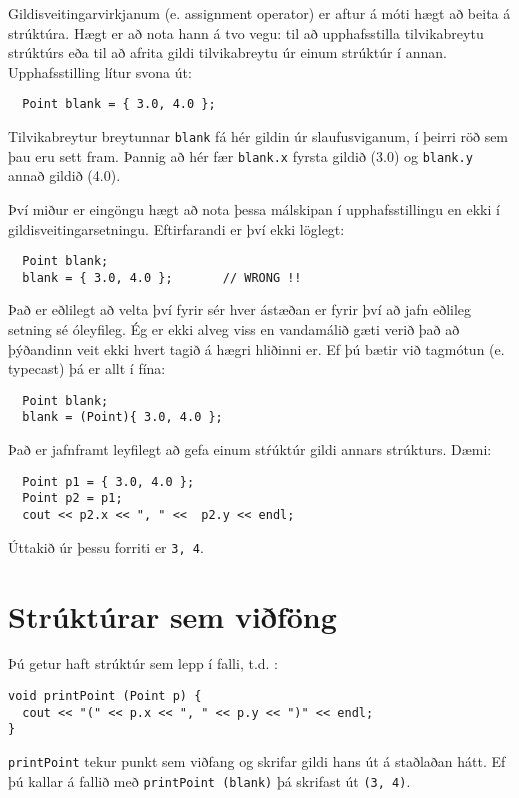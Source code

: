 Gildisveitingarvirkjanum (e. assignment operator) er aftur á móti hægt að beita á strúktúra.
Hægt er að nota hann á tvo vegu: til að upphafsstilla tilvikabreytu strúktúrs eða til að afrita gildi tilvikabreytu úr einum strúktúr í annan.
Upphafsstilling lítur svona út:

\begin{verbatim}
  Point blank = { 3.0, 4.0 };
\end{verbatim}
%
Tilvikabreytur breytunnar {\tt blank} fá hér gildin úr slaufusviganum, í þeirri röð sem þau eru sett fram.
Þannig að hér fær {\tt blank.x} fyrsta gildið (3.0) og {\tt blank.y} annað gildið (4.0). 

Því miður er eingöngu hægt að nota þessa málskipan í upphafsstillingu en ekki í gildisveitingarsetningu.
Eftirfarandi er því ekki löglegt:

\begin{verbatim}
  Point blank;
  blank = { 3.0, 4.0 };       // WRONG !!
\end{verbatim}
%
Það er eðlilegt að velta því fyrir sér hver ástæðan er fyrir því að jafn eðlileg setning sé óleyfileg.
Ég er ekki alveg viss en vandamálið gæti verið það að þýðandinn veit ekki hvert tagið á hægri hliðinni er.
Ef þú bætir við tagmótun (e. typecast) þá er allt í fína:

\begin{verbatim}
  Point blank;
  blank = (Point){ 3.0, 4.0 };
\end{verbatim}
%

Það er jafnframt leyfilegt að gefa einum stŕúktúr gildi annars strúkturs. Dæmi: 

\begin{verbatim}
  Point p1 = { 3.0, 4.0 };
  Point p2 = p1;
  cout << p2.x << ", " <<  p2.y << endl;
\end{verbatim}
%
Úttakið úr þessu forriti er {\tt 3, 4}.

\section{Strúktúrar sem viðföng}

Þú getur haft strúktúr sem lepp í falli, t.d. :

\begin{verbatim}
void printPoint (Point p) {
  cout << "(" << p.x << ", " << p.y << ")" << endl;
}
\end{verbatim}
%
{\tt printPoint} tekur punkt sem viðfang og skrifar gildi hans út á staðlaðan hátt.
Ef þú kallar á fallið með {\tt printPoint (blank)} þá skrifast út {\tt (3, 4)}.

